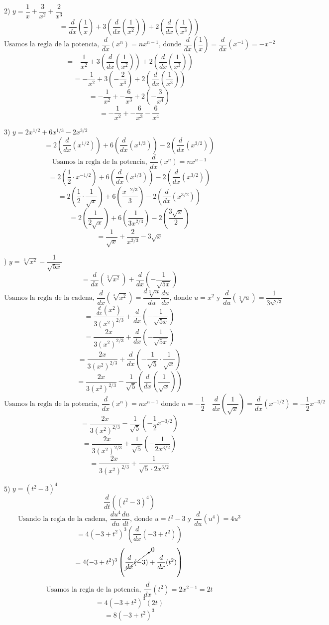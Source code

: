 \documentclass[11pt]{report}
\newcommand{\dx}{\frac{d}{dx}}
\newcommand{\dt}{\frac{d}{dt}}
\begin{document}
2) $y=\dfrac{1}{x}+\dfrac{3}{x^2}+\dfrac{2}{x^3}$
$$=\dx \left(\frac{1}{x}\right) + 3\left(\dx \left(\frac{1}{x^2}\right)\right) + 2 \left(\dx \left(\frac{1}{x^3}\right)\right)$$
$$\text{Usamos la regla de la potencia, }\dx (x^n)=n x^{n-1}\text{, donde }\dx\left(\frac{1}{x}\right)=\dx (x^{-1})=-x^{-2} $$ 
$$=-\frac{1}{x^2} + 3\left(\dx \left(\frac{1}{x^2}\right)\right) + 2 \left(\dx \left(\frac{1}{x^3}\right)\right)$$
$$=-\frac{1}{x^2} + 3\left( -\frac{2}{x^3} \right) + 2 \left(\dx \left(\frac{1}{x^3}\right)\right)$$
$$=-\frac{1}{x^2} + -\frac{6}{x^3} + 2 \left( -\frac{3}{x^4} \right)$$
$$=-\frac{1}{x^2} + -\frac{6}{x^3} -\frac{6}{x^4}$$

3) $y=2x^{1/2}+6x^{1/3}-2x^{3/2}$
$$=2\left( \dx \left( x^{1/2} \right) \right) + 6\left( \dx \left( x^{1/3} \right) \right) -2 \left( \dx \left( x^{3/2} \right) \right)$$
$$\text{Usamos la regla de la potencia, }\dx (x^n)=n x^{n-1}$$ 
$$=2\left( \frac{1}{2}\cdot x^{-1/2} \right)+ 6\left( \dx \left( x^{1/3} \right) \right) -2 \left( \dx \left( x^{3/2} \right) \right)$$
$$=2\left( \frac{1}{2}\cdot \frac{1}{\sqrt{x}} \right)+ 6\left( \frac{x^{-2/3}}{3} \right) -2 \left( \dx \left( x^{3/2} \right) \right)$$
$$=2\left( \frac{1}{2\sqrt{x}} \right)+ 6\left( \frac{1}{3x^{2/3}} \right) -2 \left( \frac{3\sqrt{x}}{2} \right)$$
$$=\frac{1}{\sqrt{x}} + \frac{2}{x^{2/3}} -3\sqrt{x}$$

) $y=\sqrt[3]{x^2}-\dfrac{1}{\sqrt{5x}}$
$$=\dx \left(\sqrt[3]{x^2}\right) +\dx \left( -\dfrac{1}{\sqrt{5x}} \right)$$
$$\text{Usamos la regla de la cadena, }\dx \left(\sqrt[3]{x^2}\right)=\frac{d\sqrt[3]{u}}{du}\frac{du}{dx}\text{, donde }u=x^2 \text{ y } \frac{d}{du}\left( \sqrt[3]{u} \right) = \frac{1}{3u^{2/3}}$$
$$=\frac{\dx (x^2)}{3(x^2)^{2/3}} +\dx \left( -\dfrac{1}{\sqrt{5x}} \right)$$
$$=\frac{2x}{3(x^2)^{2/3}} +\dx \left( -\dfrac{1}{\sqrt{5x}} \right)$$
$$=\frac{2x}{3(x^2)^{2/3}} +\dx \left( -\dfrac{1}{\sqrt{5}}\cdot \frac{1}{\sqrt{x}} \right)$$
$$=\frac{2x}{3(x^2)^{2/3}} -\dfrac{1}{\sqrt{5}}\left( \dx \left( \frac{1}{\sqrt{x}} \right) \right)$$
$$\text{Usamos la regla de la potencia, }\dx (x^n)=n x^{n-1}\text{ donde }n=-\frac{1}{2}\quad \dx \left(\frac{1}{\sqrt{x}}\right)=\dx (x^{-1/2})=-\frac{1}{2}x^{-3/2}$$ 
$$=\frac{2x}{3(x^2)^{2/3}} -\dfrac{1}{\sqrt{5}}\left(-\frac{1}{2}x^{-3/2}\right)$$
$$=\frac{2x}{3(x^2)^{2/3}} +\dfrac{1}{\sqrt{5}}\left(-\frac{1}{2x^{3/2}}\right)$$
$$=\frac{2x}{3(x^2)^{2/3}} +\dfrac{1}{\sqrt{5}\cdot 2x^{3/2}}$$

5) $y=(t^2-3)^4$
$$\dt \left( (t^2-3)^4 \right)$$
$$\text{Usando la regla de la cadena, }\frac{du^4}{du}\frac{du}{dt}\text{, donde }u=t^2-3 \text{ y }\frac{d}{du}(u^4)=4u^3$$
$$=4(-3+t^2)^3\left(\dx (-3+t^2)\right)$$
$$=4(-3+t^2)^3\left( \cancelto{0}{\dx (-3)}+\dx (t^2) \right)$$
$$\text{Usamos la regla de la potencia, }\dx (t^2)=2 x^{2-1}= 2t$$ 
$$=4(-3+t^2)^3(2t)$$
$$=8(-3+t^2)^3$$
\end{document}
